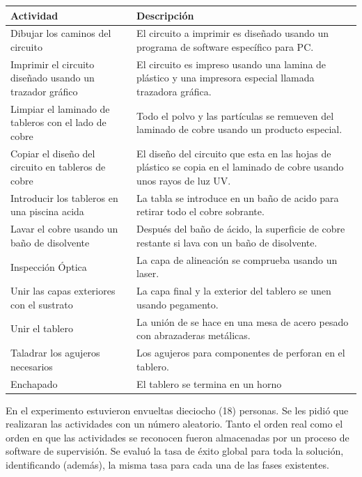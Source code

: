 \documentclass{article}
\begin{document}
\begin{table}[H]
\begin{flushleft}
\begin{tabular}{ | m{5cm} | m{6cm} | }
\hline \textbf{Actividad} & \textbf{Descripción} \\ \hline
Dibujar los caminos del circuito & El circuito a imprimir es diseñado usando un programa de software específico para PC. \\ \hline
Imprimir el circuito diseñado usando un trazador gráfico & El circuito es impreso usando una lamina de plástico y una impresora especial llamada trazadora gráfica. \\ \hline
Limpiar el laminado de tableros con el lado de cobre & Todo el polvo y las partículas se remueven del laminado de cobre usando un producto especial. \\ \hline
Copiar el diseño del circuito en tableros de cobre & El diseño del circuito que esta en las hojas de plástico se copia en el laminado de cobre usando unos rayos de luz UV. \\ \hline
Introducir los tableros en una piscina acida & La tabla se introduce en un baño de acido para retirar todo el cobre sobrante. \\ \hline
Lavar el cobre usando un baño de disolvente & Después del baño de ácido, la superficie de cobre restante si lava con un baño de disolvente. \\ \hline
Inspección Óptica & La capa de alineación se comprueba usando un laser. \\ \hline
Unir las capas exteriores con el sustrato & La capa final y la exterior del tablero se unen usando pegamento. \\ \hline
Unir el tablero & La unión de se hace en una mesa de acero pesado con abrazaderas metálicas. \\ \hline
Taladrar los agujeros necesarios & Los agujeros para componentes de perforan en el tablero. \\ \hline
Enchapado & El tablero se termina en un horno \\ \hline
\end{tabular}
\end{flushleft}
\end{table}

En el experimento estuvieron envueltas dieciocho (18) personas. Se les pidió que realizaran las actividades con un número aleatorio. Tanto el orden real como el orden en que las actividades se reconocen fueron almacenadas por un proceso de software de supervisión. Se evaluó la tasa de éxito global para toda la solución, identificando (además), la misma tasa para cada una de las fases existentes.
\end{document}
